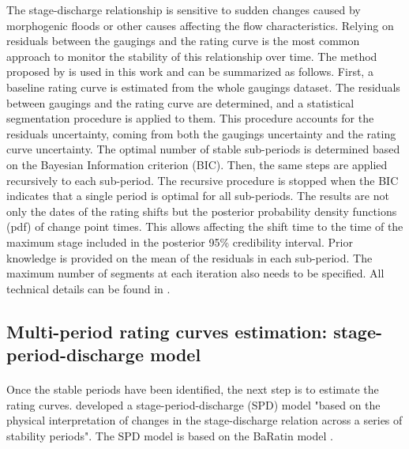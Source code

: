     The stage-discharge relationship is sensitive to sudden changes caused by morphogenic floods or other causes affecting the flow characteristics. Relying on residuals between the gaugings and the rating curve is the most common approach to monitor the stability of this relationship over time. The method proposed by \citet{darienzo_detection_2021} is used in this work and can be summarized as follows. First, a baseline rating curve is estimated from the whole gaugings dataset. The residuals between gaugings and the rating curve are determined, and a statistical segmentation procedure is applied to them. This procedure accounts for the residuals uncertainty, coming from both the gaugings uncertainty and the rating curve uncertainty. The optimal number of stable sub-periods is determined based on the Bayesian Information criterion (BIC). Then, the same steps are applied recursively to each sub-period. The recursive procedure is stopped when the BIC indicates that a single period is optimal for all sub-periods. The results are not only the dates of the rating shifts but the posterior probability density functions (pdf) of change point times. This allows affecting the shift time to the time of the maximum stage included in the posterior 95\% credibility interval. Prior knowledge is provided on the mean of the residuals in each sub-period. The maximum number of segments at each iteration also needs to be specified. All technical details can be found in \citet{darienzo_detection_2021}.
    
    \subsection{Multi-period rating curves estimation: stage-period-discharge model}
    \label{subsec:RC_SPD}
    \paragraph{}
    Once the stable periods have been identified, the next step is to estimate the rating curves. \citet{mansanarez_shift_2019} developed a stage-period-discharge (SPD) model "based on the physical interpretation of changes in the stage-discharge relation across a series of stability periods". The SPD model is based on the BaRatin model \citep{le_coz_combining_2014}.
